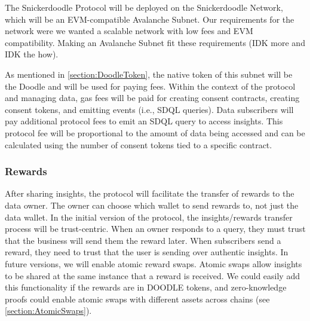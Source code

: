 The Snickerdoodle Protocol will be deployed on the Snickerdoodle Network, which will be an EVM-compatible Avalanche Subnet. Our requirements for the 
network were we wanted a scalable network with low fees and EVM compatibility. Making an Avalanche Subnet fit these requirements (IDK more and IDK the how).

As mentioned in \ref{section:DoodleToken}, the native token of this subnet will be the Doodle and will be used for paying fees. Within the context 
of the protocol and managing data, gas fees will be paid for creating consent contracts, creating consent tokens, and emitting events (i.e., SDQL queries). 
Data subscribers will pay additional protocol fees to emit an SDQL query to access insights. This protocol fee will be proportional to the amount of data 
being accessed and can be calculated using the number of consent tokens tied to a specific contract.

\subsubsection{Rewards}
After sharing insights, the protocol will facilitate the transfer of rewards to the data owner. The owner can choose which wallet to send rewards to, not 
just the data wallet. In the initial version of the protocol, the insights/rewards transfer process will be trust-centric. When an owner responds to a 
query, they must trust that the business will send them the reward later. When subscribers send a reward, they need to trust that the user is sending 
over authentic insights. In future versions, we will enable atomic reward swaps. Atomic swaps allow insights to be shared at the same instance that a 
reward is received. We could easily add this functionality if the rewards are in DOODLE tokens, and zero-knowledge proofs could enable atomic swaps 
with different assets across chains (see \ref{section:AtomicSwaps}).

